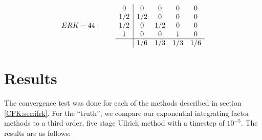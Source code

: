 \documentclass{csri19}
\begin{document}
\[ ERK - 44: \qquad
\begin{array}{c|cccc}
0   & 0   & 0   & 0   & 0 \\
1/2 & 1/2 & 0   & 0   & 0 \\
1/2 & 0   & 1/2 & 0   & 0 \\
1   & 0   & 0   & 1   & 0 \\
\hline
    & 1/6 & 1/3 & 1/3 & 1/6
\end{array} 
\]

\section{Results}\label{CFK:sec:results}
The convergence test was done for each of the methods described in section
 \ref{CFK:sec:ifrk}. For the ``truth'', we compare our 
exponential integrating factor methods to a third order, five stage 
Ullrich method with a timestep of $10^{-5}$. The results are as follows:
\end{document}
